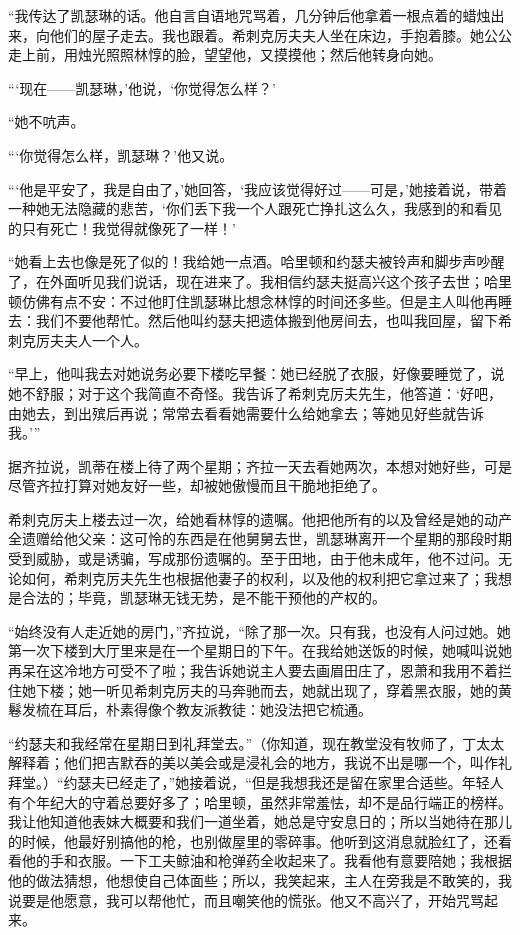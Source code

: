 \par “我传达了凯瑟琳的话。他自言自语地咒骂着，几分钟后他拿着一根点着的蜡烛出来，向他们的屋子走去。我也跟着。希刺克厉夫夫人坐在床边，手抱着膝。她公公走上前，用烛光照照林惇的脸，望望他，又摸摸他；然后他转身向她。
\par “‘现在——凯瑟琳，’他说，‘你觉得怎么样？’
\par “她不吭声。
\par “‘你觉得怎么样，凯瑟琳？’他又说。
\par “‘他是平安了，我是自由了，’她回答，‘我应该觉得好过——可是，’她接着说，带着一种她无法隐藏的悲苦，‘你们丢下我一个人跟死亡挣扎这么久，我感到的和看见的只有死亡！我觉得就像死了一样！’
\par “她看上去也像是死了似的！我给她一点酒。哈里顿和约瑟夫被铃声和脚步声吵醒了，在外面听见我们说话，现在进来了。我相信约瑟夫挺高兴这个孩子去世；哈里顿仿佛有点不安：不过他盯住凯瑟琳比想念林惇的时间还多些。但是主人叫他再睡去：我们不要他帮忙。然后他叫约瑟夫把遗体搬到他房间去，也叫我回屋，留下希刺克厉夫夫人一个人。
\par “早上，他叫我去对她说务必要下楼吃早餐：她已经脱了衣服，好像要睡觉了，说她不舒服；对于这个我简直不奇怪。我告诉了希刺克厉夫先生，他答道：‘好吧，由她去，到出殡后再说；常常去看看她需要什么给她拿去；等她见好些就告诉我。'”
\par 据齐拉说，凯蒂在楼上待了两个星期；齐拉一天去看她两次，本想对她好些，可是尽管齐拉打算对她友好一些，却被她傲慢而且干脆地拒绝了。
\par 希刺克厉夫上楼去过一次，给她看林惇的遗嘱。他把他所有的以及曾经是她的动产全遗赠给他父亲：这可怜的东西是在他舅舅去世，凯瑟琳离开一个星期的那段时期受到威胁，或是诱骗，写成那份遗嘱的。至于田地，由于他未成年，他不过问。无论如何，希刺克厉夫先生也根据他妻子的权利，以及他的权利把它拿过来了；我想是合法的；毕竟，凯瑟琳无钱无势，是不能干预他的产权的。
\par “始终没有人走近她的房门，”齐拉说，“除了那一次。只有我，也没有人问过她。她第一次下楼到大厅里来是在一个星期日的下午。在我给她送饭的时候，她喊叫说她再呆在这冷地方可受不了啦；我告诉她说主人要去画眉田庄了，恩萧和我用不着拦住她下楼；她一听见希刺克厉夫的马奔驰而去，她就出现了，穿着黑衣服，她的黄鬈发梳在耳后，朴素得像个教友派教徒：她没法把它梳通。
\par “约瑟夫和我经常在星期日到礼拜堂去。”（你知道，现在教堂没有牧师了，丁太太解释着；他们把吉默吞的美以美会或是浸礼会的地方，我说不出是哪一个，叫作礼拜堂。）“约瑟夫已经走了，”她接着说，“但是我想我还是留在家里合适些。年轻人有个年纪大的守着总要好多了；哈里顿，虽然非常羞怯，却不是品行端正的榜样。我让他知道他表妹大概要和我们一道坐着，她总是守安息日的；所以当她待在那儿的时候，他最好别搞他的枪，也别做屋里的零碎事。他听到这消息就脸红了，还看看他的手和衣服。一下工夫鲸油和枪弹药全收起来了。我看他有意要陪她；我根据他的做法猜想，他想使自己体面些；所以，我笑起来，主人在旁我是不敢笑的，我说要是他愿意，我可以帮他忙，而且嘲笑他的慌张。他又不高兴了，开始咒骂起来。
